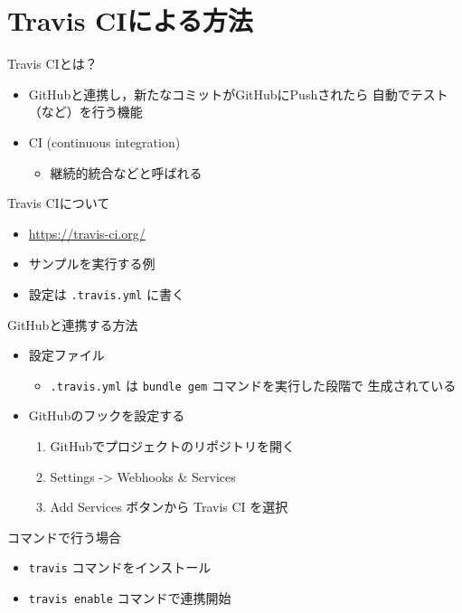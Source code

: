 \documentclass[t, aspectratio=169]{beamer}
\begin{document}
\section{Travis CIによる方法}
\label{sec-7-2}
\begin{frame}[label=sec-7-2-1]{Travis CIとは？}
\begin{itemize}
\item GitHubと連携し，新たなコミットがGitHubにPushされたら
自動でテスト（など）を行う機能
\item CI (continuous integration)
\begin{itemize}
\item 継続的統合などと呼ばれる
\end{itemize}
\end{itemize}
\end{frame}
\begin{frame}[fragile,label=sec-7-2-2]{Travis CIについて}
 \begin{itemize}
\item \url{https://travis-ci.org/}
\item サンプルを実行する例
\item 設定は \texttt{.travis.yml} に書く
\end{itemize}
\end{frame}
\begin{frame}[fragile,label=sec-7-2-3]{GitHubと連携する方法}
 \begin{itemize}
\item 設定ファイル
\begin{itemize}
\item \texttt{.travis.yml} は \texttt{bundle gem} コマンドを実行した段階で
生成されている
\end{itemize}
\item GitHubのフックを設定する
\begin{enumerate}
\item GitHubでプロジェクトのリポジトリを開く
\item Settings -> Webhooks \& Services
\item Add Services ボタンから Travis CI を選択
\end{enumerate}
\end{itemize}
\end{frame}

\begin{frame}[fragile,label=sec-7-2-4]{コマンドで行う場合}
 \begin{itemize}
\item \texttt{travis} コマンドをインストール
\item \texttt{travis enable} コマンドで連携開始
\end{itemize}
\end{frame}
\end{document}
